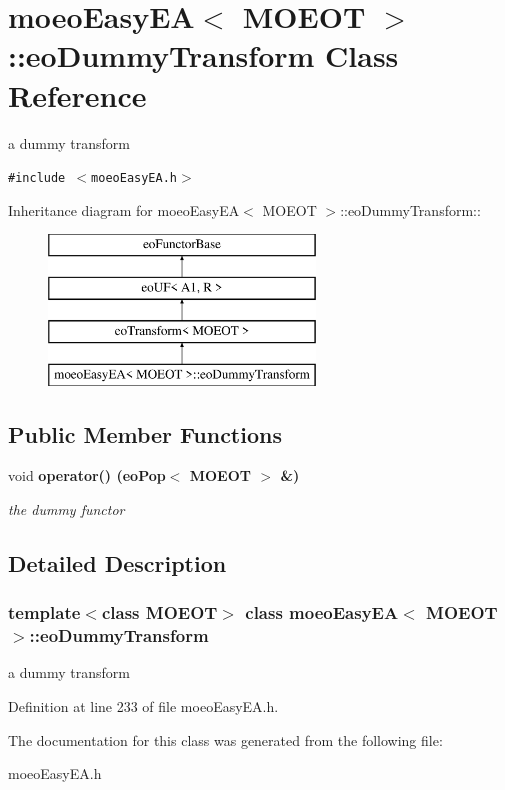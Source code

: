 \section{moeo\-Easy\-EA$<$ MOEOT $>$::eo\-Dummy\-Transform Class Reference}
\label{classmoeoEasyEA_1_1eoDummyTransform}
a dummy transform  


{\tt \#include $<$moeo\-Easy\-EA.h$>$}

Inheritance diagram for moeo\-Easy\-EA$<$ MOEOT $>$::eo\-Dummy\-Transform::\begin{figure}[H]
\begin{center}
\leavevmode
\includegraphics[height=4cm]{classmoeoEasyEA_1_1eoDummyTransform}
\end{center}
\end{figure}
\subsection*{Public Member Functions}
\begin{CompactItemize}
\item 
void \bf{operator()} (\bf{eo\-Pop}$<$ MOEOT $>$ \&)\label{classmoeoEasyEA_1_1eoDummyTransform_0e153e482291a7f19f7f7a02505fb432}

\begin{CompactList}\small\item\em the dummy functor \item\end{CompactList}\end{CompactItemize}


\subsection{Detailed Description}
\subsubsection*{template$<$class MOEOT$>$ class moeo\-Easy\-EA$<$ MOEOT $>$::eo\-Dummy\-Transform}

a dummy transform 



Definition at line 233 of file moeo\-Easy\-EA.h.

The documentation for this class was generated from the following file:\begin{CompactItemize}
\item 
moeo\-Easy\-EA.h\end{CompactItemize}
